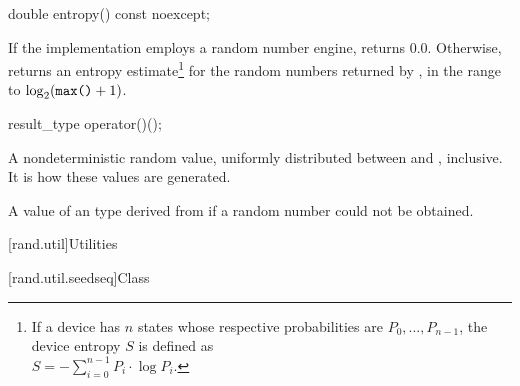 %
\begin{itemdecl}
double entropy() const noexcept;
\end{itemdecl}

\begin{itemdescr}
\pnum\returns If the implementation employs a random number engine,
 returns $0.0$.
 Otherwise, returns an entropy estimate\footnote{If a device has $n$ states
   whose respective probabilities are
   $ P_0, \ldots, P_{n-1} $,
   the device entropy $S$ is defined as\\
   $ S = - \sum_{i=0}^{n-1} P_i \cdot \log P_i $.}
 for the random numbers returned by ,
 in the range
 to
   $\log_2( \texttt{max()}+1)$.
\end{itemdescr}

%
\begin{itemdecl}
result_type operator()();
\end{itemdecl}

\begin{itemdescr}
\pnum\returns A nondeterministic random value,
 uniformly distributed
 between  and ,
 inclusive.
 It is 
 how these values are generated.

\pnum
\throws A value of an 
 type derived from 
 if a random number could not be obtained.
\end{itemdescr}




[rand.util]{Utilities}%
%


[rand.util.seedseq]{Class }%

